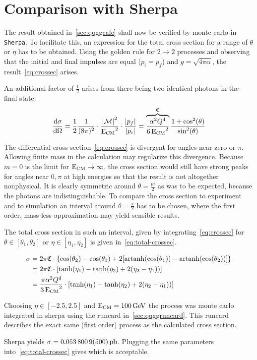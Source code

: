 \section{Comparison with Sherpa}%
\label{sec:compsher}

The result obtained in~\ref{sec:qqggcalc} shall now be verified by
monte-carlo in \verb|Sherpa|. To facilitate this, an expression for
the total cross section for a range of \(\theta\) or \(\eta\) has to
be obtained. Using the golden rule for \(2\rightarrow 2\) processes
and observing that the initial and final impulses are equal
(\(p_i=p_f\)) and \(g=\sqrt{4\pi\alpha}\), the
result~\eqref{eq:crossec} arises.

An additional
factor of \(\frac{1}{2}\) arises from there being two identical
photons in the final state.
\begin{equation}
  \label{eq:crossec}
  \dv{\sigma}{\Omega} =
  \frac{1}{2}\frac{1}{(8\pi)^2}\cdot\frac{\abs{\mathcal{M}}^2}{\operatorname{E_{\text{CM}}}^2}\cdot\frac{\abs{p_f}}{\abs{p_i}}
  = \overbrace{\frac{\alpha^2Q^4}{6\operatorname{E_{\text{CM}}}^2}}^{\mathfrak{C}}\frac{1+\cos^2(\theta)}{\sin^2(\theta)}
\end{equation}

The differential cross section~\eqref{eq:crossec} is divergent for
angles near zero or \(\pi\). Allowing finite mass in the calculation
may regularize this divergence. Because \(m=0\) is the limit for
\(\operatorname{E_{\text{CM}}}\rightarrow\infty\), the cross section would still have strong
peaks for angles near \(0,\pi\) at high energies so that the result is
not altogether nonphysical. It is clearly symmetric around
\(\theta=\frac{pi}{2}\) as was to be expected, because the photons are
indistinguishable. To compare the cross section to experiment and to
simulation an interval around \(\theta=\frac{\pi}{2}\) has to be
chosen, where the first order, mass-less approximation may yield
sensible results.

The total cross section in such an interval, given by
integrating~\eqref{eq:crossec} for \(\theta\in [\theta_1, \theta_2]\)
or \(\eta\in [\eta_1, \eta_2]\) is given in~\eqref{eq:total-crossec}.

\begin{equation}
  \label{eq:total-crossec}
  \begin{split}
  \sigma &=
  2\pi\mathfrak{C}\cdot\qty{\cos(\theta_2)-\cos(\theta_1)+2\qty[\operatorname{artanh}(\cos(\theta_1))
    - \operatorname{artanh}(\cos(\theta_2))]} \\
  &=2\pi\mathfrak{C}\cdot\qty[\tanh(\eta_1) - \tanh(\eta_2) + 2(\eta_2
  - \eta_1))] \\
  &={\frac{\pi\alpha^2Q^4}{3\operatorname{E_{\text{CM}}}^2}}\cdot\qty[\tanh(\eta_1) - \tanh(\eta_2) + 2(\eta_2
  - \eta_1))]
  \end{split}
\end{equation}

Choosing \(\eta\in [-2.5,2.5]\) and
\(\operatorname{E_{\text{CM}}}=\SI{100}{\giga\electronvolt}\) the process was monte carlo
integrated in sherpa using the runcard in~\ref{sec:qqggruncard}. This
runcard describes the exact same (first order) process as the
calculated cross section.

Sherpa yields \(\sigma = \SI{0.0538009\pm
  .00005}{\pico\barn}\). Plugging the same parameters
into~\eqref{eq:total-crossec} gives  which is
acceptable.
